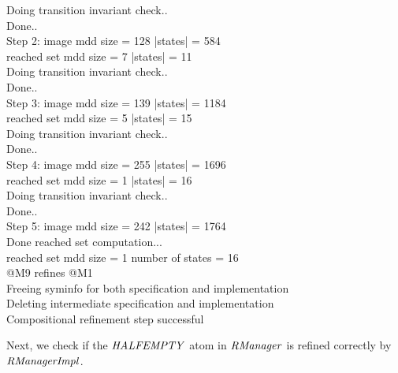 {Doing transition invariant check.. \\
Done.. \\
Step 2: image mdd size =        128	 |states| =      584	 \\
reached set mdd size =          7	 |states| =       11 \\
Doing transition invariant check.. \\
Done.. \\
Step 3: image mdd size =        139	 |states| =     1184	 \\
reached set mdd size =          5	 |states| =       15 \\
Doing transition invariant check.. \\
Done.. \\
Step 4: image mdd size =        255	 |states| =     1696	 \\
reached set mdd size =          1	 |states| =       16 \\
Doing transition invariant check.. \\
Done.. \\
Step 5: image mdd size =        242	 |states| =     1764	 \\
Done reached set computation... \\
reached set mdd size =          1	 number of states =       16 \\
@M9 refines @M1 \\
Freeing syminfo for both specification and implementation \\
Deleting intermediate specification and implementation \\
Compositional refinement step successful \\
}


\mypar
\noindent
Next, we check if the ${\it HALFEMPTY\/}$ atom in ${\it RManager\/}$ is
refined correctly by ${\it RManagerImpl\/}$.

